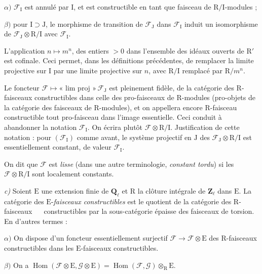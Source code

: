 \documentclass[11pt,leqno]{article}
\newcommand{\Page}[1]{\ifvmode\noindent\else\unskip\ \fi{\footnotesize\textcolor{gray}{[p.\,#1]}}\ \ignorespaces}
\begin{document}
\noindent \(\alpha)\) \(\mathscr{F}_{\mathrm{I}}\) est annulé par \(\mathrm{I}\), et est constructible en tant que faisceau de \(\mathrm{R}/\mathrm{I}\)-modules ;

\noindent \(\beta)\) pour \(\mathrm{I}\supset\mathrm{J}\), le morphisme de transition de \(\mathscr{F}_{\mathrm{J}}\) dans \(\mathscr{F}_{\mathrm{I}}\) induit un isomorphisme de \(\mathscr{F}_{\mathrm{J}}\otimes\mathrm{R}/\mathrm{I}\) avec \(\mathscr{F}_{\mathrm{I}}\).

L’application \(n\mapsto m^n\), des entiers \(>0\) dans l’ensemble des idéaux ouverts de \(\mathrm{R}'\) est cofinale. Ceci permet, dans les définitions précédentes, de remplacer la limite projective sur \(\mathrm{I}\) par une limite projective sur \(n\), avec \(\mathrm{R}/\mathrm{I}\) remplacé par \(\mathrm{R}/m^n\).

Le foncteur \(\mathscr{F}\mapsto\text{« lim proj »}\,\mathscr{F}_{\mathrm{J}}\) est pleinement fidèle, de la catégorie des \(\mathrm{R}\)-faisceaux constructibles dans celle des pro-faisceaux de \(\mathrm{R}\)-modules (pro-objets de la catégorie des faisceaux de \(\mathrm{R}\)-modules), et on appellera encore \(\mathrm{R}\)-faisceau constructible tout pro-faisceau dans l’image essentielle. Ceci conduit à abandonner la notation \(\mathscr{F}_{\mathrm{I}}\). On écrira plutôt \(\mathscr{F}\otimes\mathrm{R}/\mathrm{I}\). Justification de cette notation : pour \((\mathscr{F}_{\mathrm{I}})\) comme avant, le système projectif en \(\mathrm{J}\) des \(\mathscr{F}_{\mathrm{J}}\otimes\mathrm{R}/\mathrm{I}\) est essentiellement constant, de valeur \(\mathscr{F}_{\mathrm{I}}\).

On dit que \(\mathscr{F}\) est \textit{lisse} (dans une autre terminologie, \textit{constant tordu}) si les \(\mathscr{F}\otimes\mathrm{R}/\mathrm{I}\) sont localement constants.

\textit{c)} Soient \(\mathrm{E}\) une extension finie de \(\mathbf{Q}_\ell\) et \(\mathrm{R}\) la clôture intégrale de \(\mathbf{Z}_\ell\) dans \(\mathrm{E}\). La catégorie des \(\mathrm{E}\)-\textit{faisceaux constructibles} est le quotient de la catégorie des \(\mathrm{R}\)-faisceaux \Page{147}
constructibles par la sous-catégorie épaisse des faisceaux de torsion. En d’autres termes :

\noindent \(\alpha)\) On dispose d’un foncteur essentiellement surjectif \(\mathscr{F}\to\mathscr{F}\otimes\mathrm{E}\) des \(\mathrm{R}\)-faisceaux constructibles dans les \(\mathrm{E}\)-faisceaux constructibles.

\noindent \(\beta)\) On a \(\operatorname{Hom}(\mathscr{F}\otimes\mathrm{E},\mathscr{G}\otimes\mathrm{E})=\operatorname{Hom}(\mathscr{F},\mathscr{G})\otimes_{\mathrm{R}}\mathrm{E}\).
\end{document}

